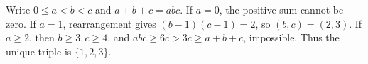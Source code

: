 Write $0\le a<b<c$ and $a+b+c=abc$. If $a=0$, the positive sum cannot be zero. If $a=1$, rearrangement gives $(b-1)(c-1)=2$, so $(b,c)=(2,3)$. If $a\ge2$, then $b\ge3,c\ge4$, and $abc\ge6c>3c\ge a+b+c$, impossible. Thus the unique triple is $\boxed{\{1,2,3\}}$.
